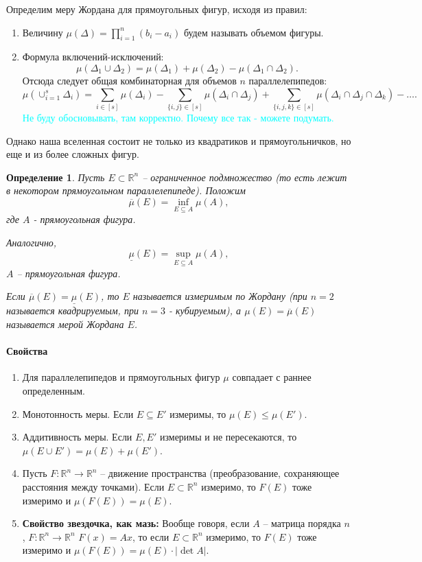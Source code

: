 \documentclass{article}
\theoremstyle{plain}
\newtheorem{definition}{Определение}
\theoremstyle{definition}
\theoremstyle{remark}
\begin{document}
Определим меру Жордана для прямоугольных фигур, исходя из правил:
\begin{enumerate}
    \item Величину $\mu(\Delta) = \prod_{i = 1}^{n} (b_i - a_i)$ будем называть объемом фигуры.

    \item Формула включений-исключений: $$\mu(\Delta_1\cup \Delta_2) = \mu(\Delta_1) + \mu(\Delta_2) - \mu(\Delta_1\cap \Delta_2).$$ Отсюда следует общая комбинаторная для объемов $n$ параллелепипедов:
    $$\mu(\cup_{i=1}^s \Delta_i) = \sum_{i\in [s]}\mu(\Delta_i) - \sum_{\{i, j\}\in [s]}\mu(\Delta_i \cap \Delta_j) +  \sum_{\{i, j, k\}\in [s]}\mu(\Delta_i \cap \Delta_j \cap \Delta_k) - \ldots.$$ 
    \textcolor{cyan}{Не буду обосновывать, там корректно. Почему все так - можете подумать.}

\end{enumerate}

Однако наша вселенная состоит не только из квадратиков и прямоугольничков, но еще и из более сложных фигур.

\begin{definition}
Пусть $E \subset \mathbb{R}^n$ -- ограниченное подмножество (то есть лежит в некотором прямоугольном параллелепипеде).
Положим $$\overline{\mu}(E) = \inf_{E \subseteq A} \mu(A),$$ где $A$ - прямоугольная фигура.

Аналогично, $$\underline{\mu}(E) = \sup_{E \subseteq A} \mu(A),$$ 
$A$ -- прямоугольная фигура.

Если $\overline{\mu}(E) = \underline{\mu}(E)$, то $E$ называется измеримым по Жордану (при $n = 2$ называется квадрируемым, при $n = 3$ - кубируемым), а $\mu(E) = \overline{\mu}(E)$ называется мерой Жордана $E$.

\end{definition}
\paragraph{Свойства}
\begin{enumerate}
    \item Для параллелепипедов и прямоугольных фигур $\mu$ совпадает с раннее определенным.
    \item Монотонность меры.
    Если $E\subseteq E'$ измеримы, то $\mu(E) \leq \mu(E')$.
    \item Аддитивность меры.
    Если $E, E'$ измеримы и не пересекаются, то $\mu(E\cup E') = \mu(E) +\mu(E')$.
    
    \item Пусть $F : \mathbb{R}^n \rightarrow \mathbb{R}^n$ -- движение пространства (преобразование, сохраняющее расстояния между точками). Если $E\subset \mathbb{R}^n$ измеримо, то $F(E)$ тоже измеримо и $\mu(F(E)) = \mu(E)$.
    
 
    \item \textbf{Свойство звездочка, как мазь:}
    Вообще говоря, если $A$ -- матрица порядка $n$, $F: \mathbb{R}^n \rightarrow \mathbb{R}^n$  $F(x) = Ax$, то если $E \subset \mathbb{R}^n$ измеримо, то $F(E)$ тоже измеримо и $\mu(F(E)) = \mu(E)\cdot |\det A|$.

\end{enumerate}
\end{document}
